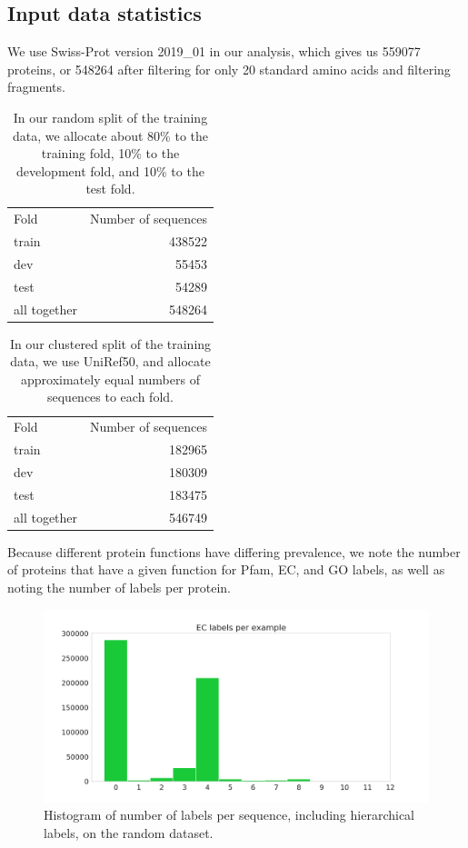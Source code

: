\subsection{Input data statistics}

We use Swiss-Prot version 2019\_01 in our analysis, which gives us 559077 proteins, or 548264 after filtering for only 20 standard amino acids and filtering fragments.
\begin{table}[htbp]
\centering
\begin{tabular}{|l|r|}
\hline
         Fold &  Number of sequences \\
\Xhline{2pt}
        train &               438522 \\
\hline
          dev &               55453 \\
\hline
         test &               54289 \\
\hline
 all together &               548264 \\
\hline
\end{tabular}
\caption{In our random split of the training data, we allocate about 80\% to the training fold, 10\% to the development fold, and 10\% to the test fold.}
\end{table}
\begin{table}[htbp]
\centering
\begin{tabular}{|l|r|}
\hline
         Fold &  Number of sequences \\
\Xhline{2pt}
        train &               182965 \\
\hline
          dev &               180309 \\
\hline
         test &               183475 \\
\hline
 all together &               546749 \\
\hline
\end{tabular}
\caption{In our clustered split of the training data, we use UniRef50, and allocate approximately equal numbers of sequences to each fold.}
\end{table}
Because different protein functions have differing prevalence, we note the number of proteins that have a given function for Pfam, EC, and GO labels, as well as noting the number of labels per protein.
\begin{figure}[htbp]
\centering
  \includegraphics[width=\textwidth]{Figures/ec_label_distribution.png}
  \caption{Histogram of number of labels per sequence, including hierarchical labels, on the random dataset.}
\end{figure}
